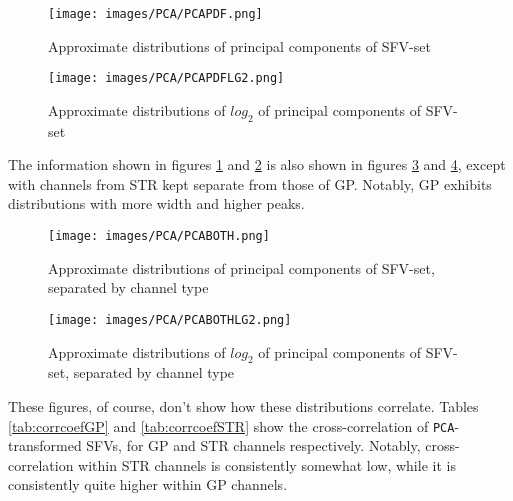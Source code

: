 \documentclass{article}
\begin{document}
\begin{figure}[H]
    \centering
    \centerline{\texttt{[image: images/PCA/PCAPDF.png]}}
    \caption{Approximate distributions of principal components of SFV-set}
    \label{fig:PCAPDF}
\end{figure}

\begin{figure}[H]
    \centering
    \centerline{\texttt{[image: images/PCA/PCAPDFLG2.png]}}
    \caption{Approximate distributions of \begin{math}log_2\end{math} of principal components of SFV-set}
    \label{fig:PCAPDFLG2}
\end{figure}

The information shown in figures \ref{fig:PCAPDF} and \ref{fig:PCAPDFLG2} is also shown in figures \ref{fig:PCAPDFBOTH} and \ref{fig:PCAPDFBOTHLG2}, except with channels from STR kept separate from those of GP.
Notably, GP exhibits distributions with more width and higher peaks.

\begin{figure}[H]
    \centering
    \centerline{\texttt{[image: images/PCA/PCABOTH.png]}}
    \caption{Approximate distributions of principal components of SFV-set, separated by channel type}
    \label{fig:PCAPDFBOTH}
\end{figure}

\begin{figure}[H]
    \centering
    \centerline{\texttt{[image: images/PCA/PCABOTHLG2.png]}}
    \caption{Approximate distributions of \begin{math}log_2\end{math} of principal components of SFV-set, separated by channel type}
    \label{fig:PCAPDFBOTHLG2}
\end{figure}

These figures, of course, don't show how these distributions correlate.
Tables \ref{tab:corrcoefGP} and \ref{tab:corrcoefSTR} show the cross-correlation of \texttt{PCA}-transformed SFVs, for GP and STR channels respectively.
Notably, cross-correlation within STR channels is consistently somewhat low, while it is consistently quite higher within GP channels.
\end{document}
